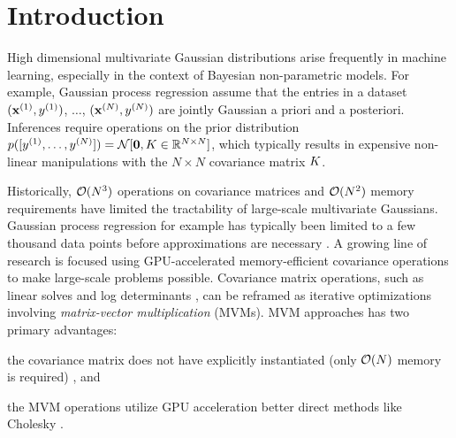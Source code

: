\section{Introduction}

High dimensional multivariate Gaussian distributions arise frequently in machine learning, especially in the context of Bayesian non-parametric models.
For example, Gaussian process regression assume that the entries in a dataset $(\mathbf{x}^{(1)}, y^{(1)})$, $\ldots$, $(\mathbf{x}^{(N)}, y^{(N)})$ are jointly Gaussian a priori and a posteriori.
Inferences require operations on the prior distribution $p([y^{(1)}, \ldots, y^{(N)}]) = \normaldist{\bzero}{\bK \in \reals^{N \times N}}$,
which typically results in expensive non-linear manipulations with the $N \times N$ covariance matrix $K$.

Historically, $\bigo{N^3}$ operations on covariance matrices and $\bigo{N^2}$ memory requirements have limited the tractability of large-scale multivariate Gaussians.
Gaussian process regression for example has typically been limited to a few thousand data points before approximations are necessary \cite{hensman2013gaussian}.
A growing line of research is focused using GPU-accelerated memory-efficient covariance operations  to make large-scale problems possible.
Covariance matrix operations, such as linear solves  and log determinants , can be reframed as iterative optimizations involving \emph{matrix-vector multiplication} (MVMs).
MVM approaches has two primary advantages:
\begin{enumerate*}
  \item the covariance matrix does not have explicitly instantiated (only $\bigo{N}$ memory is required) \cite{wang2019exact,charlier2020kernel}, and
  \item the MVM operations utilize GPU acceleration better direct methods like Cholesky \cite{gardner2018gpytorch}.
\end{enumerate*}

